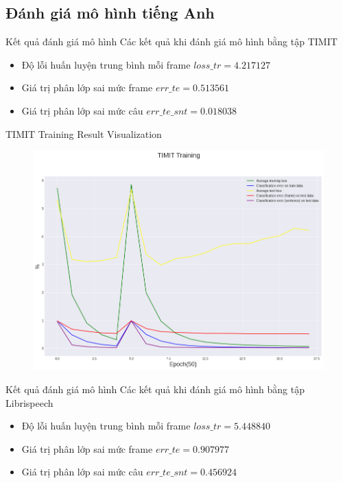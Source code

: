 \documentclass[notheorems, aspectratio=54]{beamer}
\begin{document}
\subsection{Đánh giá mô hình \textbf{tiếng Anh}}
\begin{frame}{Kết quả đánh giá mô hình}
	Các kết quả khi đánh giá mô hình bằng tập TIMIT
	\begin{itemize}
		\item Độ lỗi huấn luyện trung bình mỗi frame $loss\_tr=4.217127$
		\item Giá trị phân lớp sai mức frame $err\_te=0.513561$
		\item Giá trị phân lớp sai mức câu $err\_te\_snt =0.018038$
	\end{itemize}
\end{frame}
\begin{frame}{TIMIT Training Result Visualization}
	\begin{figure}[H]
		\includegraphics[width=0.8\linewidth]{result/sincnet_timit_plot.png}
		\label{fig:writing-thesis}
	\end{figure}
\end{frame}
\begin{frame}{Kết quả đánh giá mô hình}
	Các kết quả khi đánh giá mô hình bằng tập Librispeech
	\begin{itemize}
		\item Độ lỗi huấn luyện trung bình mỗi frame $loss\_tr=5.448840$
		\item Giá trị phân lớp sai mức frame $err\_te=0.907977$
		\item Giá trị phân lớp sai mức câu $err\_te\_snt =0.456924$
	\end{itemize}
\end{frame}
\end{document}
